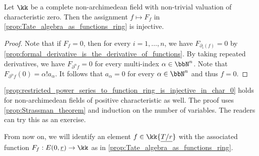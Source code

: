     \begin{corollary}\label{prop:restricted_power_series_to_function_ring_is_injective_in_char_0}
        Let \(\kk\) be a complete non-archimedean field with non-trivial valuation of characteristic zero.
        Then the assignment \(f \mapsto F_f\) in \cref{prop:Tate_algebra_as_functions_ring} is injective.
    \end{corollary}
    \begin{proof}
        Note that if \(F_f = 0\), then for every \(i = 1, \ldots, n\), we have \(F_{\partial_i(f)} = 0\) by \cref{prop:formal_derivative_is_the_derivative_of_functions}.
        By taking repeated derivatives, we have \(F_{\partial^\alpha f} = 0\) for every multi-index \(\alpha \in \bbN^n\).
        Note that \(F_{\partial^\alpha f}(0) = \alpha! a_\alpha\).
        It follows that \(a_\alpha = 0\) for every \(\alpha \in \bbN^n\) and thus \(f = 0\).
    \end{proof}

    \begin{remark}\label{rmk:restricted_power_series_to_function_ring_is_injective}
        \cref{prop:restricted_power_series_to_function_ring_is_injective_in_char_0} holds for non-archimedean fields of positive characteristic as well.
        The proof uses \cref{prop:Strassman_theorem} and induction on the number of variables.
        The readers can try this as an exercise.
    \end{remark}

    From now on, we will identify an element \(f \in \kk\{ \underline{T/r} \} \) with the associated function \(F_f:E(0,\underline{r}) \to \kk\) as in \cref{prop:Tate_algebra_as_functions_ring}.

